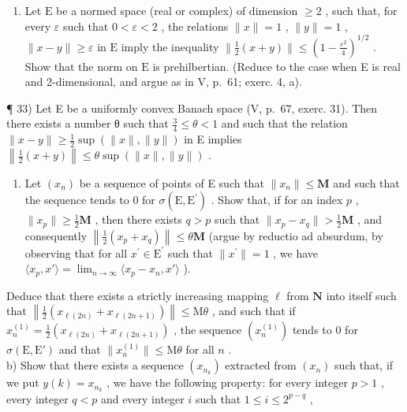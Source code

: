 \begin{enumerate}
\def\labelenumi{\arabic{enumi})}
\setcounter{enumi}{31}
\tightlist
\item
  Let \(\mathrm{E}\) be a normed space (real or complex) of dimension \(\geqslant 2\) , such that, for every \(\varepsilon\) such that \(0 < \varepsilon < 2\) , the relations \(\| x \| = 1\) , \(\| y \| = 1\) , \(\| x - y \| \geqslant \varepsilon\) in \(\mathrm{E}\) imply the inequality \(\| \frac{1}{2}(x + y) \| \leqslant \left(1 - \frac{\varepsilon^2}{4}\right)^{1/2}\) . Show that the norm on \(\mathrm{E}\) is prehilbertian. (Reduce to the case when E is real and 2-dimensional, and argue as in V, p.~61; exerc. 4, a).
\end{enumerate}

¶ 33) Let E be a uniformly convex Banach space (V, p.~67, exerc. 31). Then there exists a number θ such that \(\frac{3}{4} \leqslant \theta < 1\) and such that the relation \(\|x - y\| \geqslant \frac{1}{2} \sup (\|x\|, \|y\|)\) in E implies \(\left\|\frac{1}{2}(x + y)\right\| \leqslant \theta \sup (\|x\|, \|y\|)\) .

\begin{enumerate}
\def\labelenumi{\alph{enumi})}
\tightlist
\item
  Let \((x_{n})\) be a sequence of points of E such that \(\| x_{n}\| \leqslant \mathbf{M}\) and such that the sequence tends to 0 for \(\sigma (\mathrm{E},\mathrm{E}^{\prime})\) . Show that, if for an index \(p\) , \(\| x_p\| \geqslant \frac{1}{2}\mathbf{M}\) , then there exists \(q > p\) such that \(\| x_p - x_q\| >\frac{1}{2}\mathbf{M}\) , and consequently \(\left\| \frac{1}{2} (x_p + x_q)\right\| \leqslant \theta \mathbf{M}\) (argue by reductio ad absurdum, by observing that for all \(x^{\prime}\in \mathrm{E}^{\prime}\) such that \(\| x^{\prime}\| = 1\) , we have \(\langle x_p,x'\rangle = \lim_{n\to \infty}\langle x_p - x_n,x'\rangle\) ).
\end{enumerate}

Deduce that there exists a strictly increasing mapping \(\ell\) from \(\mathbf{N}\) into itself such that \(\left\| \frac{1}{2} (x_{\ell(2n)} + x_{\ell(2n+1)})\right\| \leqslant \mathrm{M}\theta\) , and such that if \(x_{n}^{(1)} = \frac{1}{2} (x_{\ell(2n)} + x_{\ell(2n+1)})\) , the sequence \((x_{n}^{(1)})\) tends to 0 for \(\sigma(\mathrm{E},\mathrm{E}')\) and that \(\| x_n^{(1)}\| \leqslant \mathrm{M}\theta\) for all \(n\) .\\
b) Show that there exists a sequence \((x_{n_k})\) extracted from \((x_{n})\) such that, if we put \(y(k) = x_{n_k}\) , we have the following property: for every integer \(p > 1\) , every integer \(q < p\) and every integer \(i\) such that \(1 \leqslant i \leqslant 2^{p - q}\) ,

